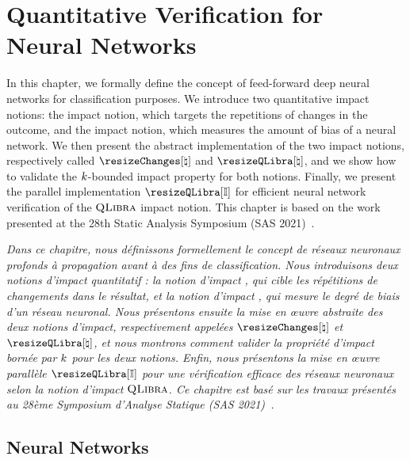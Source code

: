 \chapter{Quantitative Verification for Neural Networks}

In this chapter, we formally define the concept of feed-forward deep neural networks for classification purposes.
We introduce two quantitative impact notions: the \changesname{} impact notion, which targets the repetitions of changes in the outcome, and the \qlibraname{} impact notion, which measures the amount of bias of a neural network. We then present the abstract implementation of the two impact notions, respectively called $\abstractchangesname$ and $\abstractqlibraname$, and we show how to validate the $k$-bounded impact property for both notions. Finally, we present the parallel implementation $\parallelqlibraname$ for efficient neural network verification of the $\textup{\textsc{QLibra}}$ impact notion.
This chapter is based on the work presented at the 28th Static Analysis Symposium (SAS 2021)~\cite{Mazzucato2021}.

\emph{Dans ce chapitre, nous définissons formellement le concept de réseaux neuronaux profonds à propagation avant à des fins de classification.
Nous introduisons deux notions d'impact quantitatif : la notion d'impact \changesname{}, qui cible les répétitions de changements dans le résultat, et la notion d'impact \qlibraname{}, qui mesure le degré de biais d'un réseau neuronal. Nous présentons ensuite la mise en œuvre abstraite des deux notions d'impact, respectivement appelées $\abstractchangesname$ et $\abstractqlibraname$, et nous montrons comment valider la propriété d'impact bornée par $k$ pour les deux notions. Enfin, nous présentons la mise en œuvre parallèle $\parallelqlibraname$ pour une vérification efficace des réseaux neuronaux selon la notion d'impact $\textup{\textsc{QLibra}}$.
Ce chapitre est basé sur les travaux présentés au 28ème Symposium d'Analyse Statique (SAS 2021)~.}

% 
% 
% 
% 
% 

\section{Neural Networks}

